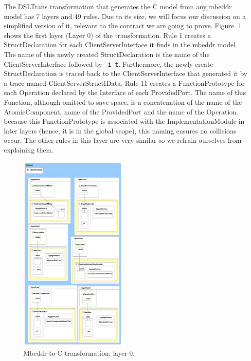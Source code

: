 The DSLTrans transformation that generates the C model from any mbeddr model has
 7 layers and 49 rules. Due to its size, we will focus our discussion on a
simplified version of it, relevant to the contract we are going to prove.
Figure~\ref{fig:mb2c_layer_0} shows the first layer (Layer 0) of the
transformation. Rule 1 creates a StructDeclaration for each
ClientServerInterface it finds in the mbeddr model.
The name of this newly created StructDeclaration is the name of the
ClientServerInterface followed by \verb=_i_t=.
Furthermore, the newly create StructDeclaration is traced back to the
ClientServerInterface that generated it by a trace named
ClientServerStructIData.
Rule 11 creates a FunctionPrototype for each Operation declared by the
Interface of each ProvidedPort. The name of this Function, although omitted to
save space, is a concatenation of the name of the AtomicComponent, name of the
ProvidedPort and the name of the Operation. because this FunctionPrototype is
associated with the ImplementationModule in later layers (hence, it is in the
global scope), this naming ensures no collisions occur.
The other rules in this layer are very similar so we refrain ourselves from
explaining them.

\begin{figure}
\begin{center}
  \includegraphics[width=0.48\textwidth]{figures/mbeddr2C_optimized_layer_0}
  \caption{Mbeddr-to-C transformation: layer 0.}
  \label{fig:mb2c_layer_0}
\end{center}
\end{figure}

